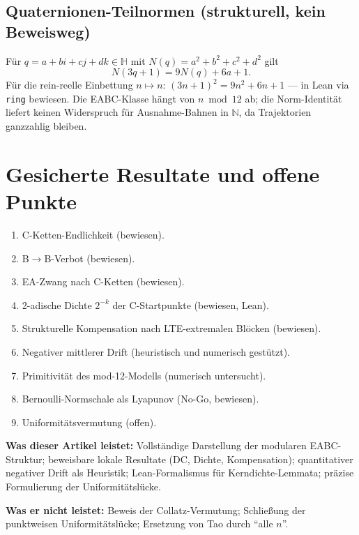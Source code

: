 \documentclass[12pt,a4paper]{article}
\newcommand{\N}{\mathbb{N}}
\begin{document}
\subsection{Quaternionen-Teilnormen (strukturell, kein Beweisweg)}

Für $q = a + bi + cj + dk \in \mathbb{H}$ mit $N(q) = a^2+b^2+c^2+d^2$ gilt
\[
  N(3q+1) = 9N(q) + 6a + 1.
\]
Für die rein-reelle Einbettung $n \mapsto n$:
$(3n+1)^2 = 9n^2 + 6n + 1$ --- in Lean via \texttt{ring} bewiesen.
Die EABC-Klasse hängt von $n \bmod 12$ ab; die Norm-Identität liefert
keinen Widerspruch für Ausnahme-Bahnen in $\N$, da Trajektorien
ganzzahlig bleiben.

\section{Gesicherte Resultate und offene Punkte}
\label{sec:resultate}

\begin{enumerate}
\item C-Ketten-Endlichkeit (bewiesen).
\item B$\to$B-Verbot (bewiesen).
\item EA-Zwang nach C-Ketten (bewiesen).
\item 2-adische Dichte $2^{-k}$ der C-Startpunkte (bewiesen, Lean).
\item Strukturelle Kompensation nach LTE-extremalen Blöcken (bewiesen).
\item Negativer mittlerer Drift (heuristisch und numerisch gestützt).
\item Primitivität des mod-12-Modells (numerisch untersucht).
\item Bernoulli-Normschale als Lyapunov (No-Go, bewiesen).
\item Uniformitätsvermutung (offen).
\end{enumerate}

\begin{tcolorbox}[kern]
\textbf{Was dieser Artikel leistet:} Vollständige Darstellung der modularen
EABC-Struktur; beweisbare lokale Resultate (DC, Dichte, Kompensation);
quantitativer negativer Drift als Heuristik; Lean-Formalismus für
Kerndichte-Lemmata; präzise Formulierung der Uniformitätslücke.

\textbf{Was er nicht leistet:} Beweis der Collatz-Vermutung; Schließung
der punktweisen Uniformitätslücke; Ersetzung von Tao durch ``alle $n$''.
\end{tcolorbox}
\end{document}
